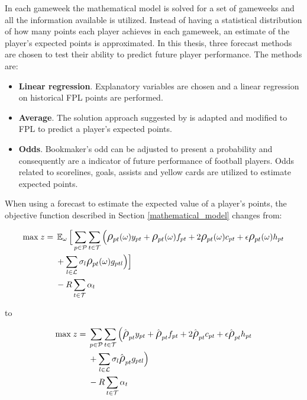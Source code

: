 In each gameweek the mathematical model is solved for a set of gameweeks and all the information available is utilized. Instead of having a statistical distribution of how many points each player achieves in each gameweek, an estimate of the player's expected points is approximated. In this thesis, three forecast methods are chosen to test their ability to predict future player performance. The methods are: 
\begin{itemize}
    \item \textbf{Linear regression}. Explanatory variables are chosen and a linear regression on historical FPL points are performed. 
    \item \textbf{Average}. The solution approach suggested by \cite{Bonomo} is adapted and modified to FPL to predict a player's expected points.
    \item \textbf{Odds}. Bookmaker's odd can be adjusted to present a probability and consequently are a indicator of future performance of football players. Odds related to scorelines, goals, assists and yellow cards are utilized to estimate expected points. 
\end{itemize}

When using a forecast to estimate the expected value of a player's points, the objective function described in Section \ref{mathematical_model} changes from: 

\begin{equation*}
\smaller
\begin{aligned}
\text{max} \; z ={} & \EX_{\omega} \Big\lbrack\sum\limits_{p \in \mathcal{P}} \sum\limits_{t \in \mathcal{T}} \Big( \mathlarger{\rho}_{pt}(\omega)y_{pt} + \mathlarger{\rho}_{pt}(\omega)f_{pt} + 2 \mathlarger{\rho}_{pt}(\omega)c_{pt} + \epsilon  \mathlarger{\rho}_{pt}(\omega)h_{pt} \\ 
& + \sum_{l \in \mathcal{L}}\sigma_{l} \mathlarger{\rho}_{pt}(\omega)g_{ptl} \Big)  \Big\rbrack \\ 
& - R\sum_{t \in \mathcal{T}}\alpha_{t}
\end{aligned}
\end{equation*}

to 

\begin{equation*}
\smaller
\begin{aligned}
\text{max} \; z ={} &  \sum\limits_{p \in \mathcal{P}} \sum\limits_{t \in \mathcal{T}} \Big( \hat{\mathlarger{\rho}}_{pt} y_{pt} + \hat{\mathlarger{\rho}}_{pt} f_{pt} + 2 \hat{\mathlarger{\rho}}_{pt} c_{pt} + \epsilon  \hat{\mathlarger{\rho}}_{pt} h_{pt} \\ 
& + \sum_{l \in \mathcal{L}}\sigma_{l} \hat{\mathlarger{\rho}}_{pt} g_{ptl} \Big)  \\ 
& - R\sum_{t \in \mathcal{T}}\alpha_{t}
\end{aligned}
\end{equation*}


